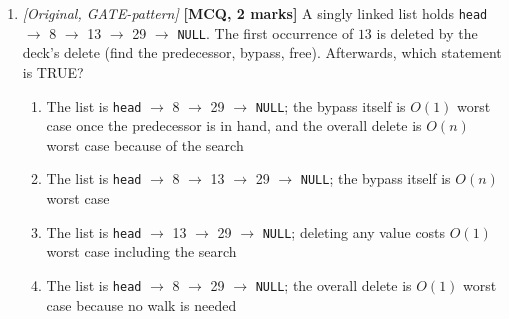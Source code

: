 \documentclass[11pt]{article}
\begin{document}
\begin{enumerate}
\item[\textbf{Q8}] \textit{[Original, GATE-pattern]} \textbf{[MCQ, 2 marks]} A singly linked list holds \texttt{head} $\to$ 8 $\to$ 13 $\to$ 29 $\to$ \texttt{NULL}. The first occurrence of $13$ is deleted by the deck's delete (find the predecessor, bypass, free). Afterwards, which statement is TRUE?
\begin{enumerate}
  \item[(A)] The list is \texttt{head} $\to$ 8 $\to$ 29 $\to$ \texttt{NULL}; the bypass itself is $O(1)$ worst case once the predecessor is in hand, and the overall delete is $O(n)$ worst case because of the search
  \item[(B)] The list is \texttt{head} $\to$ 8 $\to$ 13 $\to$ 29 $\to$ \texttt{NULL}; the bypass itself is $O(n)$ worst case
  \item[(C)] The list is \texttt{head} $\to$ 13 $\to$ 29 $\to$ \texttt{NULL}; deleting any value costs $O(1)$ worst case including the search
  \item[(D)] The list is \texttt{head} $\to$ 8 $\to$ 29 $\to$ \texttt{NULL}; the overall delete is $O(1)$ worst case because no walk is needed
\end{enumerate}

\end{enumerate}
\end{document}
